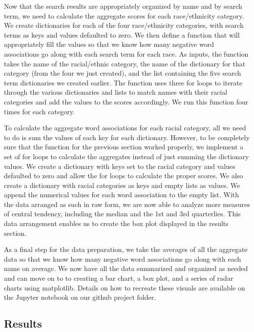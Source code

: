 \documentclass[sigconf]{acmart}
\begin{document}
Now that the search results are appropriately organized by name and by search term, we need to calculate the aggregate scores for each race/ethnicity category. We create dictionaries for each of the four race/ethnicity categories, with search terms as keys and values defaulted to zero. We then define a function that will appropriately fill the values so that we know how many negative word associations go along with each search term for each race. As inputs, the function takes the name of the racial/ethnic category, the name of the dictionary for that category (from the four we just created), and the list containing the five search term dictionaries we created earlier. The function uses three for loops to iterate through the various dictionaries and lists to match names with their racial categories and add the values to the scores accordingly. We run this function four times for each category.

To calculate the aggregate word associations for each racial category, all we need to do is sum the values of each key for each dictionary. However, to be completely sure that the function for the previous section worked properly, we implement a set of for loops to calculate the aggregates instead of just summing the dictionary values. We create a dictionary with keys set to the racial category and values defaulted to zero and allow the for loops to calculate the proper scores. We also create a dictionary with racial categories as keys and empty lists as values. We append the numerical values for each word association to the empty list. With the data arranged as such in raw form, we are now able to analyze more measures of central tendency, including the median and the 1st and 3rd quarterlies. This data arrangement enables us to create the box plot displayed in the results section.

As a final step for the data preparation, we take the averages of all the aggregate data so that we know how many negative word associations go along with each name on average. We now have all the data summarized and organized as needed and can move on to to creating a bar chart, a box plot, and a series of radar charts using matplotlib. Details on how to recreate these visuals are available on the Jupyter notebook on our github project folder.









\subsection{Results}
\end{document}
